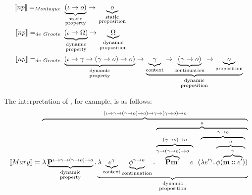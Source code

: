 \begin{subequations}
\begin{align}
\I{np} =_{Montague} \ & \underbrace{(\iota \rightarrow   o)}_{
\begin{smallmatrix}
\text{static}\\
\text{property}
\end{smallmatrix}} \rightarrow \underbrace{o}_{\begin{smallmatrix}
\text{static}\\
\text{proposition}
\end{smallmatrix}} \label{eq:np:M:1} \\
\I{np} =_{de~Groote} \ & \underbrace{(\iota \rightarrow  \Omega )}_{\begin{smallmatrix}
\text{dynamic}\\
\text{property}
\end{smallmatrix}} \rightarrow \underbrace{\Omega}_{
\begin{smallmatrix}
\text{dynamic}\\
\text{proposition}
\end{smallmatrix}} \label{eq:np:dG:1} \\
\I{np} =_{de~Groote} \ & \underbrace{(\iota \rightarrow \gamma \rightarrow (\gamma \rightarrow o) \rightarrow o)}_{
\begin{smallmatrix}
\text{dynamic}\\
\text{property}
\end{smallmatrix}} \rightarrow \underbrace{\underbrace{\gamma}_{\text{context}} \rightarrow \underbrace{(\gamma \rightarrow o)}_{\text{continuation}} \rightarrow \underbrace{o}_{\text{proposition}}}_{\begin{smallmatrix}
\text{dynamic}\\
\text{proposition}
\end{smallmatrix}} \label{eq:np:dG:2}
\end{align}
\label{eq:np:MdG}
\end{subequations}

The interpretation of , for example, is as follows: 
\begin{align}
\I{Mary} =  \overbrace{\lambda \underbrace{{\P2}^{\iota \rightarrow \gamma \rightarrow (\gamma \rightarrow o) \rightarrow o}}_{\begin{smallmatrix}
\text{dynamic}\\
\text{property}
\end{smallmatrix}}. \underbrace{\lambda \underbrace{{e}^{\gamma}}_{\text{context}} \underbrace{{\phi}^{\gamma \rightarrow o}}_{\text{continuation}}. \overbrace{\overbrace{\overbrace{\P2 {\textbf{m}}^{\iota}}^{\gamma \rightarrow (\gamma \rightarrow o) \rightarrow o} e}^{(\gamma \rightarrow o) \rightarrow o} \ \ (\overbrace{\lambda e'^{\gamma}. \overbrace{\phi ( \overbrace{\upii{\textbf{m}}{e'}}^{\gamma})}^{o}}^{\gamma \rightarrow o})}^{o}}_{
\begin{smallmatrix}
\text{dynamic}\\
\text{proposition}
\end{smallmatrix}}}^{(\iota \rightarrow \gamma \rightarrow (\gamma \rightarrow o) \rightarrow o) \rightarrow \gamma \rightarrow (\gamma \rightarrow o) \rightarrow o}\label{eq:dG:Mary}
\end{align}

